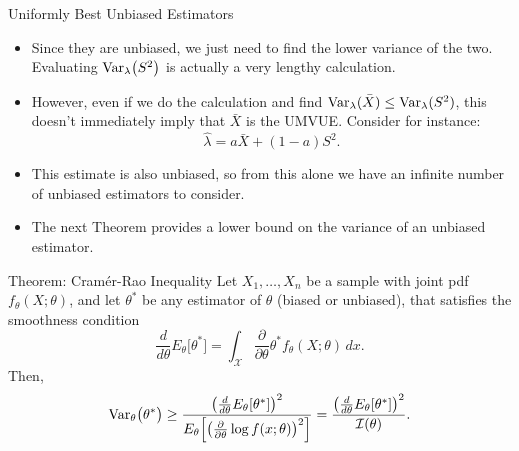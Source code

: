 \begin{frame}[allowframebreaks]{Uniformly Best Unbiased Estimators}
    \begin{itemize}

    \item Since they are unbiased, we just need to find the lower variance of the two. Evaluating $\mathrm{Var}_\lambda\big(S^2\big)$ is actually a very lengthy calculation.
    \item However, even if we do the calculation and find $\mathrm{Var}_\lambda(\bar{X}) \leq \mathrm{Var}_\lambda(S^2)$, this doesn't immediately imply that $\bar{X}$ is the UMVUE. Consider for instance:
    $$
    \hat{\lambda} = a\bar{X} + (1-a)S^2.
    $$

    \item This estimate is also unbiased, so from this alone we have an infinite number of unbiased estimators to consider.
    \item The next Theorem provides a \alert{lower bound} on the variance of an unbiased estimator.
    \end{itemize}

  \framebreak

  \begin{block}{Theorem: Cram\'er-Rao Inequality}
    Let $X_1, \ldots, X_n$ be a sample with joint pdf $f_\theta(X;\theta)$, and let $\theta^*$ be any estimator of $\theta$ (biased or unbiased), that satisfies the smoothness condition
    $$
    \frac{d}{d\theta} E_\theta\big[\theta^*\big] = \int_{\mathcal{X}} \frac{\partial}{\partial \theta} \theta^*f_\theta(X;\theta)\, dx.
    $$
    Then,
    $$
    \mathrm{Var}_\theta\big(\theta^*\big) \geq \frac{\big(\frac{d}{d\theta}E_\theta[\theta^*]\big)^2}{E_\theta\Big[\big(\frac{\partial}{\partial \theta} \log f(x; \theta)\big)^2\Big]} = \frac{\big(\frac{d}{d\theta}E_\theta[\theta^*]\big)^2}{\mathcal{I}(\theta)}.
    $$

\end{block}
\end{frame}
